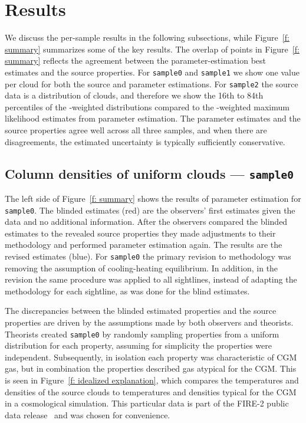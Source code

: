 \documentclass[fleqn,usenatbib]{mnras}
\begin{document}
\section{Results}
\label{s: results}

We discuss the per-sample results in the following subsections, while Figure~\ref{f: summary} summarizes some of the key results.
The overlap of points in Figure~\ref{f: summary} reflects the agreement between the parameter-estimation best estimates and the source properties.
For \texttt{sample0} and \texttt{sample1} we show one value per cloud for both the source and parameter estimations.
For \texttt{sample2} the source data is a distribution of clouds, and therefore we show the 16th to 84th percentiles of the -weighted distributions compared to the -weighted maximum likelihood estimates from parameter estimation.
The parameter estimates and the source properties agree well across all three samples,
and when there are disagreements, the estimated uncertainty is typically sufficiently conservative.

\subsection{Column densities of uniform clouds --- \texttt{sample0}}
\label{s: results -- sample0}

The left side of Figure~\ref{f: summary} shows the results of parameter estimation for \texttt{sample0}.
The blinded estimates (red)  are the observers' first estimates given the data and no additional information.
After the observers compared the blinded estimates to the revealed source properties they made adjustments to their methodology and performed parameter estimation again.
The results are the revised estimates (blue).
For \texttt{sample0} the primary revision to methodology was removing the assumption of cooling-heating equilibrium.
In addition, in the revision the same procedure was applied to all sightlines, instead of adapting the methodology for each sightline, as was done for the blind estimates.

The discrepancies between the blinded estimated properties and the source properties are driven by the assumptions made by both observers and theorists.
Theorists created \texttt{sample0} by randomly sampling properties from a uniform distribution for each property, assuming for simplicity the properties were independent.
Subsequently, in isolation each property was characteristic of CGM gas, but in combination the properties described gas atypical for the CGM.
This is seen in Figure~\ref{f: idealized explanation}, which compares the temperatures and densities of the source clouds to temperatures and densities typical for the CGM in a cosmological simulation.
This particular data is part of the FIRE-2 public data release~\citep{wetzel2022Public} and was chosen for convenience.
\end{document}
